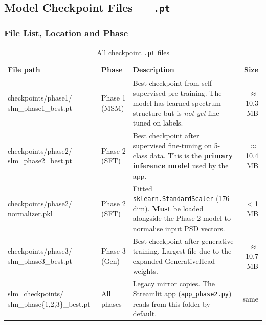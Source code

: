 \documentclass[11pt,a4paper]{article}
\begin{document}
\subsection{Model Checkpoint Files — \texttt{.pt}}

\subsubsection{File List, Location and Phase}

\begin{table}[h!]
\centering
\caption{All checkpoint \texttt{.pt} files}
\renewcommand{\arraystretch}{1.4}
\begin{tabularx}{\textwidth}{>{\ttfamily\footnotesize}l l X r}
\toprule
\textbf{File path} & \textbf{Phase} & \textbf{Description} & \textbf{Size} \\
\midrule

checkpoints/phase1/ slm\_phase1\_best.pt
  & Phase 1 (MSM)
  & Best checkpoint from self-supervised pre-training.
    The model has learned spectrum structure but is \emph{not yet}
    fine-tuned on labels.
  & $\approx$10.3 MB \\[4pt]

checkpoints/phase2/ slm\_phase2\_best.pt
  & Phase 2 (SFT)
  & Best checkpoint after supervised fine-tuning on 5-class data.
    This is the \textbf{primary inference model} used by the app.
  & $\approx$10.4 MB \\[4pt]

checkpoints/phase2/ normalizer.pkl
  & Phase 2 (SFT)
  & Fitted \texttt{sklearn.StandardScaler} (176-dim). \textbf{Must} be
    loaded alongside the Phase 2 model to normalise input PSD vectors.
  & $<$1 MB \\[4pt]

checkpoints/phase3/ slm\_phase3\_best.pt
  & Phase 3 (Gen)
  & Best checkpoint after generative training. Largest file due to the
    expanded GenerativeHead weights.
  & $\approx$10.7 MB \\[4pt]

slm\_checkpoints/ slm\_phase\{1,2,3\}\_best.pt
  & All phases
  & Legacy mirror copies. The Streamlit app (\texttt{app\_phase2.py})
    reads from this folder by default.
  & same \\
\bottomrule
\end{tabularx}
\end{table}
\end{document}
